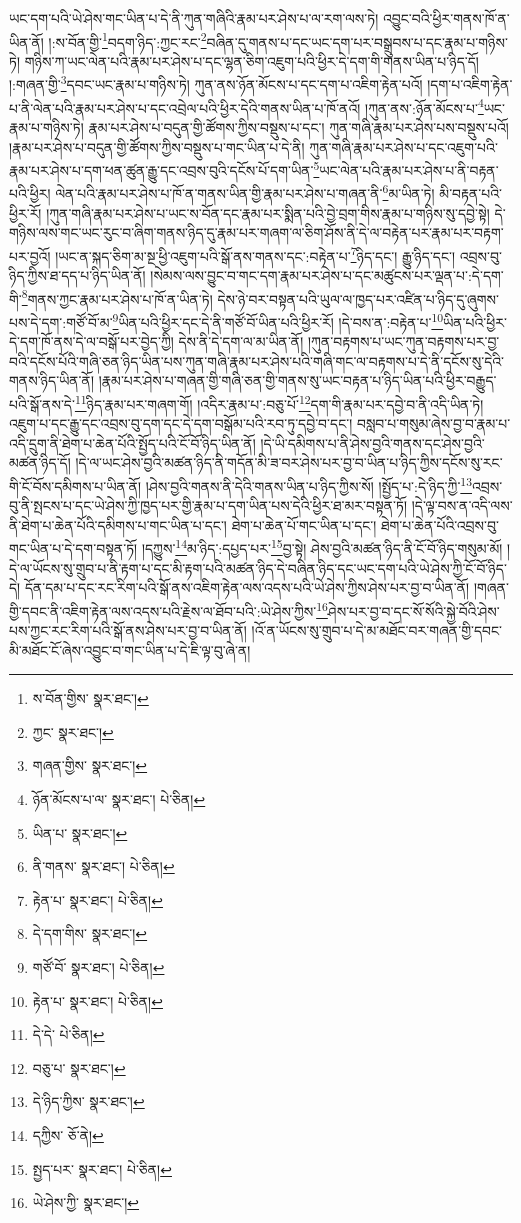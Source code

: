 ཡང་དག་པའི་ཡེ་ཤེས་གང་ཡིན་པ་དེ་ནི་ཀུན་གཞིའི་རྣམ་པར་ཤེས་པ་ལ་རག་ལས་ཏེ། འབྱུང་བའི་ཕྱིར་གནས་ཁོ་ན་ཡིན་ནོ། །:ས་བོན་གྱི་\footnote{ས་བོན་གྱིས་  སྣར་ཐང་། }བདག་ཉིད་:ཀྱང་རང་\footnote{ཀྱང་  སྣར་ཐང་། }བཞིན་དུ་གནས་པ་དང་ཡང་དག་པར་བསྒྲུབས་པ་དང་རྣམ་པ་གཉིས་ཏེ། གཉིས་ཀ་ཡང་ལེན་པའི་རྣམ་པར་ཤེས་པ་དང་ལྷན་ཅིག་འཇུག་པའི་ཕྱིར་དེ་དག་གི་གནས་ཡིན་པ་ཉིད་དོ། །:གཞན་གྱི་\footnote{གཞན་གྱིས་  སྣར་ཐང་། }དབང་ཡང་རྣམ་པ་གཉིས་ཏེ། ཀུན་ནས་ཉོན་མོངས་པ་དང་དག་པ་འཇིག་རྟེན་པའོ། །དག་པ་འཇིག་རྟེན་པ་ནི་ལེན་པའི་རྣམ་པར་ཤེས་པ་དང་འབྲེལ་པའི་ཕྱིར་དེའི་གནས་ཡིན་པ་ཁོ་ནའོ། །ཀུན་ནས་:ཉོན་མོངས་པ་\footnote{ཉོན་མོངས་པ་ལ་  སྣར་ཐང་།  པེ་ཅིན། }ཡང་རྣམ་པ་གཉིས་ཏེ། རྣམ་པར་ཤེས་པ་བདུན་གྱི་ཚོགས་ཀྱིས་བསྡུས་པ་དང་། ཀུན་གཞི་རྣམ་པར་ཤེས་པས་བསྡུས་པའོ། །རྣམ་པར་ཤེས་པ་བདུན་གྱི་ཚོགས་ཀྱིས་བསྡུས་པ་གང་ཡིན་པ་དེ་ནི། ཀུན་གཞི་རྣམ་པར་ཤེས་པ་དང་འཇུག་པའི་རྣམ་པར་ཤེས་པ་དག་ཕན་ཚུན་རྒྱུ་དང་འབྲས་བུའི་དངོས་པོ་དག་ཡིན་\footnote{ཡིན་པ་  སྣར་ཐང་། }ཡང་ལེན་པའི་རྣམ་པར་ཤེས་པ་ནི་བརྟན་པའི་ཕྱིར། ལེན་པའི་རྣམ་པར་ཤེས་པ་ཁོ་ན་གནས་ཡིན་གྱི་རྣམ་པར་ཤེས་པ་གཞན་ནི་\footnote{ནི་གནས་  སྣར་ཐང་།  པེ་ཅིན། }མ་ཡིན་ཏེ། མི་བརྟན་པའི་ཕྱིར་རོ། །ཀུན་གཞི་རྣམ་པར་ཤེས་པ་ཡང་ས་བོན་དང་རྣམ་པར་སྨིན་པའི་བྱེ་བྲག་གིས་རྣམ་པ་གཉིས་སུ་དབྱེ་སྟེ། དེ་གཉིས་ལས་གང་ཡང་རུང་བ་ཞིག་གནས་ཉིད་དུ་རྣམ་པར་གཞག་ལ་ཅིག་ཤོས་ནི་དེ་ལ་བརྟེན་པར་རྣམ་པར་བརྟག་པར་བྱའོ། །ཡང་ན་སྐད་ཅིག་མ་སྔ་ཕྱི་འཇུག་པའི་སྒོ་ནས་གནས་དང་:བརྟེན་པ་\footnote{རྟེན་པ་  སྣར་ཐང་།  པེ་ཅིན། }ཉིད་དང་། རྒྱུ་ཉིད་དང་། འབྲས་བུ་ཉིད་ཀྱིས་ཐ་དད་པ་ཉིད་ཡིན་ནོ། །སེམས་ལས་བྱུང་བ་གང་དག་རྣམ་པར་ཤེས་པ་དང་མཚུངས་པར་ལྡན་པ་:དེ་དག་གི་\footnote{དེ་དག་གིས་  སྣར་ཐང་། }གནས་ཀྱང་རྣམ་པར་ཤེས་པ་ཁོ་ན་ཡིན་ཏེ། དེས་ཉེ་བར་བསྟན་པའི་ཡུལ་ལ་ཁྱད་པར་འཛིན་པ་ཉིད་དུ་ཞུགས་པས་དེ་དག་:གཙོ་བོ་མ་\footnote{གཙོ་བོ་  སྣར་ཐང་།  པེ་ཅིན། }ཡིན་པའི་ཕྱིར་དང་དེ་ནི་གཙོ་བོ་ཡིན་པའི་ཕྱིར་རོ། །དེ་བས་ན་:བརྟེན་པ་\footnote{རྟེན་པ་  སྣར་ཐང་།  པེ་ཅིན། }ཡིན་པའི་ཕྱིར་དེ་དག་ཁོ་ནས་དེ་ལ་བསྒོ་པར་བྱེད་ཀྱི། དེས་ནི་དེ་དག་ལ་མ་ཡིན་ནོ། །ཀུན་བརྟགས་པ་ཡང་ཀུན་བརྟགས་པར་བྱ་བའི་དངོས་པོའི་གཞི་ཅན་ཉིད་ཡིན་པས་ཀུན་གཞི་རྣམ་པར་ཤེས་པའི་གཞི་གང་ལ་བརྟགས་པ་དེ་ནི་དངོས་སུ་དེའི་གནས་ཉིད་ཡིན་ནོ། །རྣམ་པར་ཤེས་པ་གཞན་གྱི་གཞི་ཅན་གྱི་གནས་སུ་ཡང་བརྟན་པ་ཉིད་ཡིན་པའི་ཕྱིར་བརྒྱུད་པའི་སྒོ་ནས་དེ་\footnote{དེ་དེ་  པེ་ཅིན། }ཉིད་རྣམ་པར་གཞག་གོ། །འདིར་རྣམ་པ་:བཅུ་པོ་\footnote{བཅུ་པ་  སྣར་ཐང་། }དག་གི་རྣམ་པར་དབྱེ་བ་ནི་འདི་ཡིན་ཏེ། འཇུག་པ་དང་རྒྱུ་དང་འབྲས་བུ་དག་དང་དེ་དག་བསྒོམ་པའི་རབ་ཏུ་དབྱེ་བ་དང་། བསླབ་པ་གསུམ་ཞེས་བྱ་བ་རྣམ་པ་འདི་དྲུག་ནི་ཐེག་པ་ཆེན་པོའི་སྤྱོད་པའི་ངོ་བོ་ཉིད་ཡིན་ནོ། །དེ་ཡི་དམིགས་པ་ནི་ཤེས་བྱའི་གནས་དང་ཤེས་བྱའི་མཚན་ཉིད་དོ། །དེ་ལ་ཡང་ཤེས་བྱའི་མཚན་ཉིད་ནི་གདོན་མི་ཟ་བར་ཤེས་པར་བྱ་བ་ཡིན་པ་ཉིད་ཀྱིས་དངོས་སུ་རང་གི་ངོ་བོས་དམིགས་པ་ཡིན་ནོ། །ཤེས་བྱའི་གནས་ནི་དེའི་གནས་ཡིན་པ་ཉིད་ཀྱིས་སོ། །སྤྱོད་པ་:དེ་ཉིད་ཀྱི་\footnote{དེ་ཉིད་ཀྱིས་  སྣར་ཐང་། }འབྲས་བུ་ནི་སྤངས་པ་དང་ཡེ་ཤེས་ཀྱི་ཁྱད་པར་གྱི་རྣམ་པ་དག་ཡིན་པས་དེའི་ཕྱིར་ཐ་མར་བསྟན་ཏོ། །དེ་ལྟ་བས་ན་འདི་ལས་ནི་ཐེག་པ་ཆེན་པོའི་དམིགས་པ་གང་ཡིན་པ་དང་། ཐེག་པ་ཆེན་པོ་གང་ཡིན་པ་དང་། ཐེག་པ་ཆེན་པོའི་འབྲས་བུ་གང་ཡིན་པ་དེ་དག་བསྟན་ཏོ། །དཀྱུས་\footnote{དཀྱིས་  ཅོ་ནེ། }མ་ཉིད་:དཔྱད་པར་\footnote{སྤྱད་པར་  སྣར་ཐང་།  པེ་ཅིན། }བྱ་སྟེ། ཤེས་བྱའི་མཚན་ཉིད་ནི་ངོ་བོ་ཉིད་གསུམ་མོ། །དེ་ལ་ཡོངས་སུ་གྲུབ་པ་ནི་རྟག་པ་དང་མི་རྟག་པའི་མཚན་ཉིད་དེ་བཞིན་ཉིད་དང་ཡང་དག་པའི་ཡེ་ཤེས་ཀྱི་ངོ་བོ་ཉིད་དེ། དོན་དམ་པ་དང་རང་རིག་པའི་སྒོ་ནས་འཇིག་རྟེན་ལས་འདས་པའི་ཡེ་ཤེས་ཀྱིས་ཤེས་པར་བྱ་བ་ཡིན་ནོ། །གཞན་གྱི་དབང་ནི་འཇིག་རྟེན་ལས་འདས་པའི་རྗེས་ལ་ཐོབ་པའི་:ཡེ་ཤེས་ཀྱིས་\footnote{ཡེ་ཤེས་ཀྱི་  སྣར་ཐང་། }ཤེས་པར་བྱ་བ་དང་སོ་སོའི་སྐྱེ་བོའི་ཤེས་པས་ཀྱང་རང་རིག་པའི་སྒོ་ནས་ཤེས་པར་བྱ་བ་ཡིན་ནོ། །འོ་ན་ཡོངས་སུ་གྲུབ་པ་དེ་མ་མཐོང་བར་གཞན་གྱི་དབང་མི་མཐོང་ངོ་ཞེས་འབྱུང་བ་གང་ཡིན་པ་དེ་ཇི་ལྟ་བུ་ཞེ་ན། 